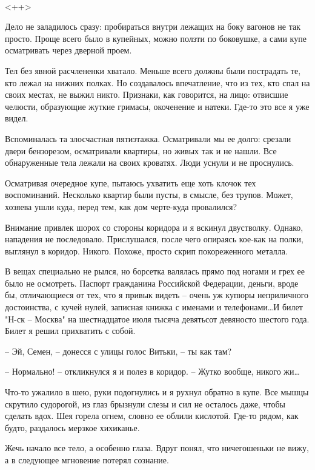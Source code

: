 \documentclass[a4paper]{book}
\begin{document}
\paragraph{}<++>

Дело не заладилось сразу: пробираться внутри лежащих на боку вагонов не так просто. Проще всего было в купейных, можно ползти по боковушке, а сами купе осматривать через дверной проем. 

Тел без явной расчлененки хватало. Меньше всего должны были пострадать те, кто лежал на нижних полках. Но создавалось впечатление, что из тех, кто спал на своих местах, не выжил никто. Признаки, как говорится, на лицо: отвисшие челюсти, образующие жуткие гримасы, окоченение и  натеки. Где-то это все я уже видел.

Вспоминалась та злосчастная пятиэтажка. Осматривали мы ее долго: срезали двери бензорезом, осматривали квартиры, но живых так и не нашли. Все обнаруженные тела лежали на своих кроватях. Люди уснули и не проснулись. 

Осматривая очередное купе, пытаюсь ухватить еще хоть клочок тех воспоминаний. Несколько квартир были пусты, в смысле, без трупов. Может, хозяева ушли куда, перед тем, как дом черте-куда провалился? 

Внимание привлек шорох со стороны коридора и я вскинул двустволку. Однако, нападения не последовало. Прислушался, после чего опираясь кое-как на полки, выглянул в коридор. Никого. Похоже, просто скрип покореженного металла. 

В вещах специально не рылся, но борсетка валялась прямо под ногами и грех ее было не осмотреть. Паспорт гражданина Российской Федерации, деньги, вроде бы, отличающиеся от тех, что я привык видеть -- очень уж купюры неприличного достоинства, с кучей нулей, записная книжка с именами и телефонами\ldots И билет "Н-ск -- Москва" на шестнадцатое июля тысяча девятьсот девяносто шестого года. Билет я решил прихватить с собой.

-- Эй, Семен, -- донесся с улицы голос Витьки, -- ты как там? 

-- Нормально! -- откликнулся я и полез в коридор.  -- Жутко вообще, никого жи\ldots

Что-то ужалило в шею, руки подогнулись и я рухнул обратно в купе. Все мышцы скрутило судорогой, из глаз брызнули слезы и сил не осталось даже, чтобы сделать вдох. Шея горела огнем, словно ее облили кислотой. Где-то рядом, как будто, раздалось мерзкое хихиканье. 

Жечь начало все тело, а особенно глаза. Вдруг понял, что ничегошеньки не вижу, а в следующее мгновение потерял сознание. 
\end{document}
